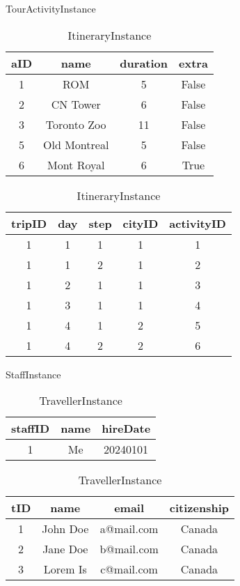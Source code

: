\documentclass{article}
\begin{document}
\begin{table}[H]
\parbox{.45\linewidth}{
    \centering
    \caption*{TourActivityInstance}
    \begin{tabular}{|c|c|c|c|} 
    \hline
    aID & name & duration & extra \\ [.5ex] 
    \hline\hline
    1 & ROM & 5 & False \\
    \hline
    2 & CN Tower & 6 & False \\
    \hline
    3 & Toronto Zoo & 11 & False \\
    \hline
    5 & Old Montreal & 5 & False \\
    \hline
    6 & Mont Royal & 6 & True \\
    \hline
    \end{tabular}
}
\hfill
\parbox{.45\linewidth}{
    \centering
    \caption*{ItineraryInstance}
    \begin{tabular}{|c|c|c|c|c|} 
    \hline
    tripID & day & step & cityID & activityID \\ [.5ex] 
    \hline\hline
    1 & 1 & 1 & 1 & 1 \\
    \hline
    1 & 1 & 2 & 1 & 2 \\
    \hline
    1 & 2 & 1 & 1 & 3 \\
    \hline
    1 & 3 & 1 & 1 & 4 \\
    \hline
    1 & 4 & 1 & 2 & 5 \\
    \hline
    1 & 4 & 2 & 2 & 6 \\
    \hline
    \end{tabular}
}
\end{table}

\begin{table}[H]
\parbox{.45\linewidth}{
    \centering
    \caption*{StaffInstance}
    \begin{tabular}{|c|c|c|}
    \hline
    staffID & name & hireDate \\ [.5 ex]
    \hline\hline
    1 & Me & 20240101 \\
    \hline
    \end{tabular}
}
\hfill
\parbox{.45\linewidth}{
    \centering
    \caption*{TravellerInstance}
    \begin{tabular}{|c|c|c|c|}
    \hline
    tID & name & email & citizenship \\ [.5 ex]
    \hline\hline
    1 & John Doe & a@mail.com & Canada \\
    \hline
    2 & Jane Doe & b@mail.com & Canada \\
    \hline
    3 & Lorem Is & c@mail.com & Canada \\
    \hline
    \end{tabular}
}
\end{table}
\end{document}
